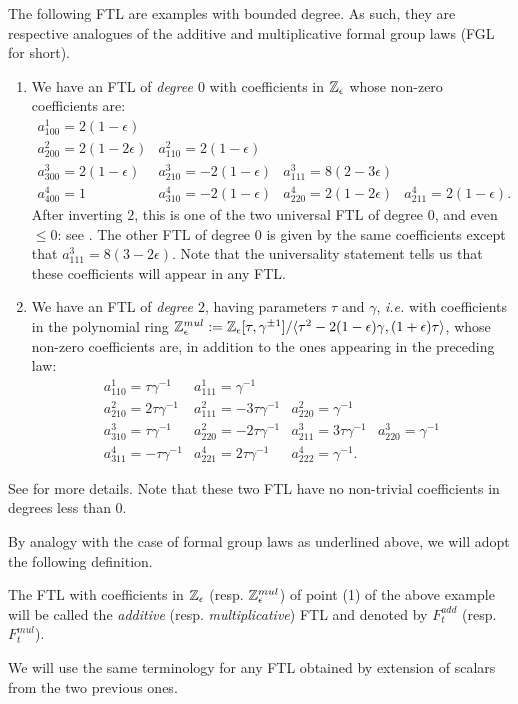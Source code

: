\begin{ex}\label{ex:FTP_low_complexity}
 The following FTL are examples with bounded degree. As such, they are respective analogues
 of the additive and multiplicative formal group laws (FGL for short).
\begin{enumerate}
\item We have an FTL of \emph{degree $0$} with coefficients in $\mathbb{Z}_\epsilon$ whose non-zero coefficients are:
$$
\begin{array}{llll}
a^1_{100}=2(1-\epsilon) & & & \\
a^2_{200}=2(1-2\epsilon) & a^2_{110}=2(1-\epsilon) & & \\
a^3_{300}=2(1-\epsilon) & a^3_{210}=-2(1-\epsilon) & a^3_{111}=8(2-3\epsilon) & \\
a^4_{400}=1 & a^4_{310}=-2(1-\epsilon) & a^4_{220}=2(1-2\epsilon) & a^4_{211}=2(1-\epsilon).
\end{array}
$$
After inverting $2$, this is one of the two universal FTL of degree $0$, and even $\leq 0$: see \cite[Th. 3.1.12]{CDFH}.
 The other FTL of degree $0$ is given by the same coefficients except that $a^3_{111}=8(3-2\epsilon)$.
 Note that the universality statement tells us that these coefficients will appear in any FTL.
\item We have an FTL of \emph{degree $2$}, having parameters $\tau$ and $\gamma$,
 \emph{i.e.} with coefficients in the polynomial ring
 $\mathbb{Z}_\epsilon^{mul}:=\mathbb{Z}_\epsilon[\tau,\gamma^{\pm 1}]/\langle \tau^2-2(1-\epsilon)\gamma, (1+\epsilon)\tau\rangle$,
 whose non-zero coefficients are, in addition to the ones appearing in the preceding law:
$$
\begin{array}{llll}
a^1_{110}=\tau\gamma^{-1} & a^1_{111}=\gamma^{-1} & & \\
a^2_{210}=2\tau\gamma^{-1} & a^2_{111}=-3\tau\gamma^{-1} & a^2_{220}=\gamma^{-1} & \\
a^3_{310}=\tau\gamma^{-1} & a^2_{220}=-2\tau\gamma^{-1} & a^3_{211}=3\tau\gamma^{-1} & a^3_{220}=\gamma^{-1} \\
a^4_{311}=-\tau\gamma^{-1} & a^4_{221}=2\tau\gamma^{-1} & a^4_{222}=\gamma^{-1}. &
\end{array}
$$
\end{enumerate}
See \cite[Theorem 6.6]{FH21} for more details. Note that these two FTL have no non-trivial coefficients in degrees less than $0$.
\end{ex}

By analogy with the case of formal group laws as underlined above,
 we will adopt the following definition.
\begin{df}\label{df:addmulFTL}
The FTL with coefficients in $\mathbb{Z}_\epsilon$ (resp. $\mathbb{Z}_\epsilon^{mul}$) of point (1) of the above example
 will be called the \emph{additive} (resp. \emph{multiplicative}) FTL
 and denoted by $F_t^{add}$ (resp. $F_t^{mul}$).

We will use the same terminology for any FTL obtained by extension of scalars
 from the two previous ones.
\end{df}

